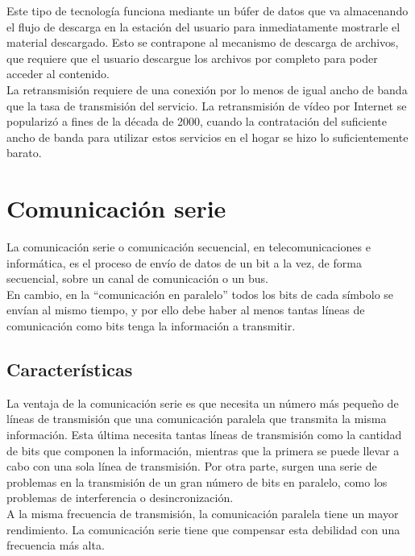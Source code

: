 Este tipo de tecnología funciona mediante un búfer de datos que va almacenando el flujo de descarga en la estación del usuario para inmediatamente mostrarle el material descargado. Esto se contrapone al mecanismo de
descarga de archivos, que requiere que el usuario descargue los archivos por completo para poder acceder al contenido.\\

La retransmisión requiere de una conexión por lo menos de igual ancho de banda que la tasa de transmisión del servicio. La retransmisión de vídeo por Internet se popularizó a fines de la década de 2000, 
cuando la contratación del suficiente ancho de banda para utilizar estos servicios en el hogar se hizo lo suficientemente barato.

\section{Comunicación serie}

La comunicación serie o comunicación secuencial, en telecomunicaciones e informática, es el proceso de envío de datos de un bit a la vez, de forma secuencial, sobre un canal
de comunicación o un bus.\\

En cambio, en la “comunicación en paralelo” todos los bits de cada símbolo se envían al mismo tiempo, y por ello debe haber al menos tantas líneas de comunicación como bits tenga
la información a transmitir.\\

\subsection{Características}

La ventaja de la comunicación serie es que necesita un número más pequeño de líneas de transmisión que una comunicación paralela que transmita la misma información. Esta última
necesita tantas líneas de transmisión como la cantidad de bits que componen la información, mientras que la primera se puede llevar a cabo con una sola línea de transmisión. Por otra parte,
surgen una serie de problemas en la transmisión de un gran número de bits en paralelo, como los problemas de interferencia o desincronización.\\

A la misma frecuencia de transmisión, la comunicación paralela tiene un mayor rendimiento. La comunicación serie tiene que compensar esta debilidad con una frecuencia más alta.\\

